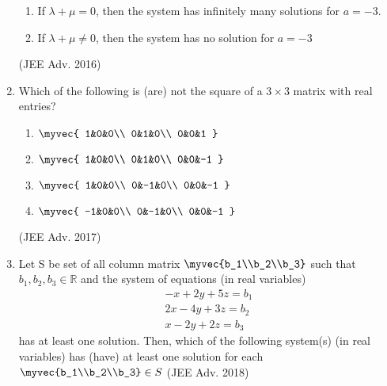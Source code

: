 \begin{enumerate}
\begin{enumerate}
            \item If $\lambda + \mu = 0$, then the system has infinitely many solutions for $a = -3$.
            \item If $\lambda + \mu \neq 0$, then the system has no solution for $a = -3$
        \end{enumerate}
        \hfill (JEE Adv. 2016)
    \item 
        Which of the following is (are) not the square of a $3 \times 3$ matrix with real entries?
            \begin{enumerate}
                \itemsep0.4em
                \item 
                    $\myvec{
                        1&0&0\\
                        0&1&0\\
                        0&0&1
                    }$\\
                \item 
                    $\myvec{
                        1&0&0\\
                        0&1&0\\
                        0&0&-1
                    }$\\
                \item 
                    $\myvec{
                        1&0&0\\
                        0&-1&0\\
                        0&0&-1
                    }$\\
                \item 
                    $\myvec{
                        -1&0&0\\
                        0&-1&0\\
                        0&0&-1
                    }$\\
            \end{enumerate}
            \hfill (JEE Adv. 2017)	
\item Let S be set of all column matrix $\myvec{b_1\\b_2\\b_3}$ such that $b_1, b_2, b_3 \in \mathbb{R}$ and the system of equations (in real variables)\begin{align*}-x+2y+5z=b_1\\2x-4y+3z=b_2\\x-2y+2z=b_3\end{align*} has at least one solution. Then, which of the following system(s) (in real variables) has (have) at least one solution for each $\myvec{b_1\\b_2\\b_3}\in S$ \hfill(JEE Adv. 2018)


\end{enumerate}
